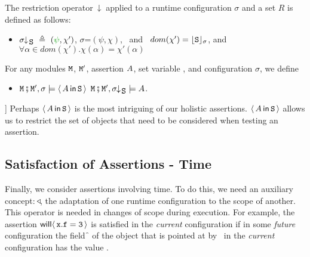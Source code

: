  
 
\begin{definition}   \label{def:restrict}
The restriction operator~$\;\!\!\downarrow\!_{} $ applied to a runtime configuration $\sigma$ and a set $R$ is defined as follows:
 \label{def:config:restrct}
 $~ $

\begin{itemize}
\item
$\restrct {\sigma}{\prg{S}} \ \triangleq \ (\sd{\psi}, \chi')$, \IFF  $\sigma$=$(\psi,\chi)$, \ and  \  $dom(\chi')={\lfloor{ {{\mbox{\tt{S}}}}}\rfloor_{\sigma}}$, and   
 $\forall \alpha\!\in\!dom(\chi').\chi(\alpha)=\chi'(\alpha)$
\end{itemize}
\end{definition}

\begin{definition}  \label{def:valid:assertion:using}
For any modules ${\mbox{\tt{\ensuremath{{\mbox{\tt{M}}}}}}}$, ${\mbox{\tt{\ensuremath{{\mbox{\tt{M}}}}}}}'$, assertion  $A$, set variable ,  and configuration $\sigma$, we define
\begin{itemize}
 \item
 ${\mbox{\tt{\ensuremath{{\mbox{\tt{M}}}}}}}\fatsemi {\mbox{\tt{\ensuremath{{\mbox{\tt{M}}}}}}}', \sigma \models \langle\, A\, \mathsf{in}\, {\mbox{\tt{S}}}\, \rangle$
 \IFF
 ${\mbox{\tt{\ensuremath{{\mbox{\tt{M}}}}}}}\fatsemi {\mbox{\tt{\ensuremath{{\mbox{\tt{M}}}}}}}', \sigma\!\!\downarrow\!_{{\mbox{\tt{S}}}} \models  A  $.
\end{itemize}
\end{definition}

]
Perhaps $\langle\, A\, \mathsf{in}\, {\mbox{\tt{S}}}\, \rangle$ is the most intriguing of our holistic assertions. $\langle\, A\, \mathsf{in}\, {\mbox{\tt{S}}}\, \rangle$ allows us to restrict the set of objects that need to be considered when testing an assertion.

\subsection{Satisfaction of Assertions - Time}
 Finally, we  consider assertions involving time. 
 To do this, we need  an  auxiliary concept:
$\!\triangleleft\!$, the adaptation of one runtime configuration to the scope  
of another. This operator is needed in changes of scope during execution. For example, the assertion
${\mathsf{will}}\langle \,{\mbox{\tt{x}}}.{\mbox{\tt{f}}}={\mbox{\tt{3}}}\,\rangle$  is satisfied in the \emph{current} configuration %
 if in some {\em future} configuration the field  \f\, of the object that is pointed at 
 by \x\, in the {\em current} configuration has the value .

